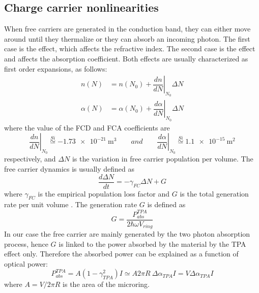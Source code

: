\subsection{Charge carrier nonlinearities}
\label{ssec:Charge_carrier_nonlinearities}
When free carriers are generated in the conduction band, they can either move around until they thermalize or they can absorb an incoming photon.
The first case is the  effect, which affects the refractive index.
The second case is the  effect and affects the absorption coefficient.
Both effects are usually characterized as first order expansions, as follows:
\begin{align}
	n			\left(N	\right) &= n				\left(N_0\right) + \left.\dfrac{dn}{dN}\right|_{N_0} \Delta N \\
	\alpha	\left(N	\right) &= \alpha	\left(N_0\right) + \left.\dfrac{d\alpha}{dN}\right|_{N_0} \Delta N
\end{align}
where the value of the \ac{FCD} and \ac{FCA} coefficients are \cite{moss2013semiconductor,johnson2006self}
\begin{equation}
	\left.\dfrac{dn}{dN}\right|_{N_0} \overset{Si}{\simeq} \SI{-1.73e-21}{\cubic\m}
	\qquad and \qquad
	\left.\dfrac{d\alpha}{dN}\right|_{N_0} \overset{Si}{\simeq} \SI{1.1e-15}{\square\m}
\end{equation}
respectively, and $\Delta N$ is the variation in free carrier population per volume.
The free carrier dynamics is usually defined as
\begin{equation}
	\frac{d\Delta N}{dt} = -\gamma_{FC} \Delta N + G
\end{equation}
where $\gamma_{FC}$ is the empirical population loss factor and $G$ is the total generation rate per unit volume \cite{mancinelli2013linear}.
The generation rate $G$ is defined as
\begin{equation}
G = \frac{P_{abs}^{TPA}}{2\hbar\omega V_{ring}}
\end{equation}
In our case the free carrier are mainly generated by the two photon absorption process, hence $G$ is linked to the power absorbed by the material by the \ac{TPA} effect only.
Therefore the absorbed power can be explained as a function of optical power:
\begin{equation}
	P_{abs}^{TPA} = A \left(1-\gamma_{TPA}^2\right) I
	\simeq A2\pi R~\Delta\alpha_{TPA} I
	= V\Delta\alpha_{TPA}I
\end{equation}
where $A=V/2\pi R$ is the area of the microring.

